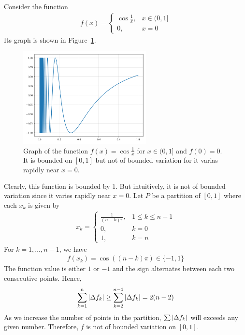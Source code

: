 \documentclass[thmcnt=section, color=blue, 12pt]{my-elegantbook}
\begin{document}
\begin{example} \label{eg:1}
	Consider the function
	\begin{align*}
		f(x) = \begin{cases}
			       \cos \frac{1}{x}, & x \in (0, 1] \\
			       0,                & x = 0
		       \end{cases}
	\end{align*}
	Its graph is shown in Figure~\ref{fig:1}.
	\begin{figure}[H]
		\centering
		\includegraphics[width=0.6\textwidth]{figures/bounded-function-that-is-not-of-bounded-variation.png}
		\caption{Graph of the function $f(x) = \cos\frac{1}{x}$ for $x \in (0, 1]$ and $f(0) = 0$. It is bounded on $[0, 1]$ but not of bounded variation for it varias rapidly near $x=0$.}
		\label{fig:1}
	\end{figure}
	Clearly, this function is bounded by $1$.
	But intuitively, it is not of bounded variation since it varies rapidly
	near $x=0$.
	Let $P$ be a partition of $[0, 1]$ where each $x_k$ is given by
	\begin{align*}
		x_k = \begin{cases}
			      \frac{1}{(n-k) \pi}, & 1 \leq k \leq n-1 \\
			      0,                   & k = 0             \\
			      1,                   & k = n
		      \end{cases}
	\end{align*}
	For $k=1, \dots, n-1$, we have
	\begin{align*}
		f(x_k) = \cos ( (n-k) \pi ) \in \{-1, 1\}
	\end{align*}
	The function value is either $1$ or $-1$ and the sign alternates between
	each two consecutive points. Hence,
	\begin{align*}
		\sum_{k=1}^{n} \left\lvert \Delta f_k \right\rvert
		\geq \sum_{k=2}^{n-1} \left\lvert \Delta f_k \right\rvert = 2 (n - 2)
	\end{align*}
	As we increase the number of points in the partition, $\sum \left\lvert \Delta f_k \right\rvert$
	will exceeds any given number.
	Therefore, $f$ is not of bounded variation on $[0, 1]$.
\end{example}
\end{document}
